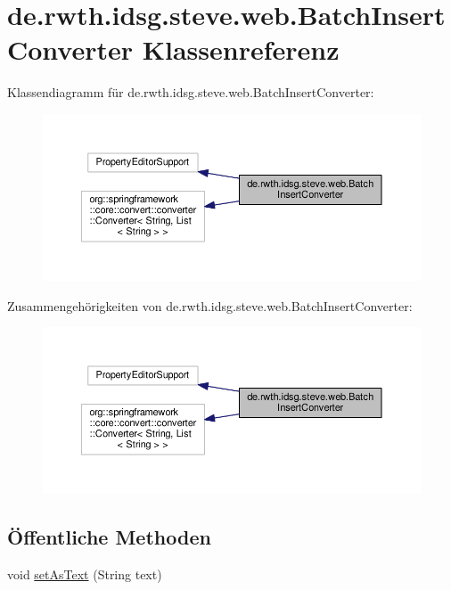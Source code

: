\hypertarget{classde_1_1rwth_1_1idsg_1_1steve_1_1web_1_1_batch_insert_converter}{\section{de.\+rwth.\+idsg.\+steve.\+web.\+Batch\+Insert\+Converter Klassenreferenz}
\label{classde_1_1rwth_1_1idsg_1_1steve_1_1web_1_1_batch_insert_converter}
}


Klassendiagramm für de.\+rwth.\+idsg.\+steve.\+web.\+Batch\+Insert\+Converter\+:\nopagebreak
\begin{figure}[H]
\begin{center}
\leavevmode
\includegraphics[width=350pt]{classde_1_1rwth_1_1idsg_1_1steve_1_1web_1_1_batch_insert_converter__inherit__graph}
\end{center}
\end{figure}


Zusammengehörigkeiten von de.\+rwth.\+idsg.\+steve.\+web.\+Batch\+Insert\+Converter\+:\nopagebreak
\begin{figure}[H]
\begin{center}
\leavevmode
\includegraphics[width=350pt]{classde_1_1rwth_1_1idsg_1_1steve_1_1web_1_1_batch_insert_converter__coll__graph}
\end{center}
\end{figure}
\subsection*{Öffentliche Methoden}
\begin{DoxyCompactItemize}
\item 
void \hyperlink{classde_1_1rwth_1_1idsg_1_1steve_1_1web_1_1_batch_insert_converter_a3f5c7a6555b6ab8ceceead22a973240e}{set\+As\+Text} (String text)
\end{DoxyCompactItemize}


